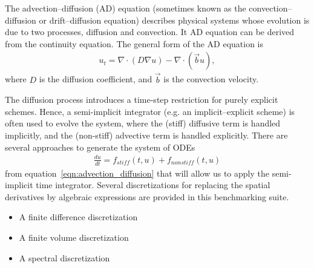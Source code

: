 The advection--diffusion (AD) equation (sometimes known as the
convection--diffusion or drift--diffusion equation) describes physical
systems whose evolution is due to two processes, diffusion and
convection.  It AD equation can be derived from the continuity
equation.  The general form of the AD equation is
\begin{align}
  u_t = \nabla\cdot(D\nabla u) - \nabla \cdot (\vec{b} u),
  \label{eqn:advection_diffusion}
\end{align}
where $D$ is the diffusion coefficient, and $\vec{b}$ is the
convection velocity.  

The diffusion process introduces a time-step restriction for purely
explicit schemes.  Hence, a semi-implicit integrator (e.g. an
implicit--explicit scheme) is often used to evolve the system, where
the (stiff) diffusive term is handled implicitly, and the (non-stiff)
advective term is handled explicitly.  There are several approaches to
generate the system of ODEs
\begin{align*}
  \frac{du}{dt} = f_{stiff}(t,u) + f_{nonstiff}(t,u) 
\end{align*}
from equation~\eqref{eqn:advection_diffusion} that will allow us to
apply the semi-implicit time integrator.  Several discretizations for
replacing the spatial derivatives by algebraic expressions are
provided in this benchmarking suite.
\begin{itemize}
\item A finite difference discretization
\item A finite volume discretization
\item A spectral discretization
\end{itemize}


